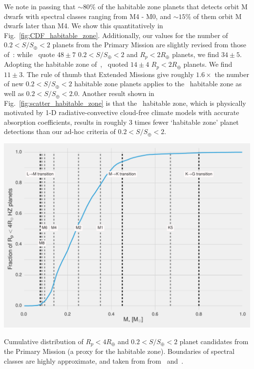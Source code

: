 \begin{enumerate}
	We note in passing that $\sim 80\%$ of the habitable zone planets that \tess detects orbit M dwarfs with spectral classes ranging from M4 - M0, and $\sim 15\%$ of them orbit M dwarfs later than M4.
	We show this quantitatively in Fig.~\ref{fig:CDF_habitable_zone}.
	Additionally, our values for the number of $0.2<S/S_\oplus<2$ planets from the Primary Mission are slightly revised from those of~: while~ quote $48\pm7$  $0.2<S/S_\oplus<2$ and $R_p<2R_\oplus$ planets, we find $34 \pm 5$.
	Adopting the habitable zone of~\citet{kopparapu_habitable_2013},~ quoted $14\pm4$  $R_p<2R_\oplus$ planets. We find $11 \pm 3$.
	The rule of thumb that Extended Missions give roughly $1.6\times$ the number of new $0.2<S/S_\oplus<2$ habitable zone planets applies to the~\citet{kopparapu_habitable_2013} habitable zone as well as $0.2<S/S_\oplus<2.0$.
	Another result shown in Fig.~\ref{fig:scatter_habitable_zone} is that the~\citet{kopparapu_habitable_2013} habitable zone, which is physically motivated by 1-D radiative-convective cloud-free climate models with accurate absorption coefficients, results in roughly 3 times fewer `habitable zone' planet detections than our ad-hoc criteria of $0.2<S/S_\oplus<2$.
	\begin{marginfigure}
		\centering
		\includegraphics[scale=1.]{figures/CDF_most_HZ_planets_orbit_early_M_dwarfs.pdf}
		\caption{Cumulative distribution of $R_p<4R_\oplus$ and $0.2<S/S_\oplus<2$ planet candidates from the Primary Mission (a proxy for the habitable zone). Boundaries of spectral classes are highly approximate, and taken from from~\protect\citet{habets_empirical_1981} and~\protect\citet{baraffe_massspectral_1996}.}

\end{marginfigure}
\end{enumerate}
